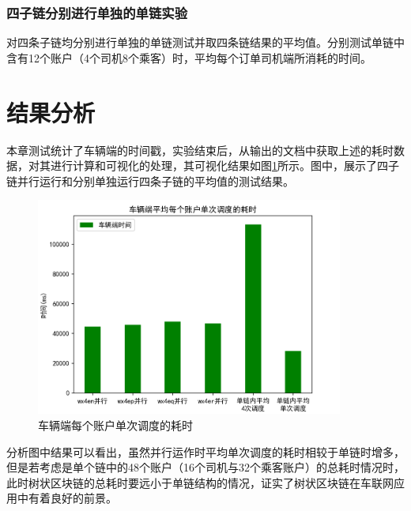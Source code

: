 \subsubsection{四子链分别进行单独的单链实验}

对四条子链均分别进行单独的单链测试并取四条链结果的平均值。分别测试单链中含有12个账户（4个司机8个乘客）时，平均每个订单司机端所消耗的时间。

\section{结果分析}

本章测试统计了车辆端的时间戳，实验结束后，从输出的文档中获取上述的耗时数据，对其进行计算和可视化的处理，其可视化结果如图\ref{fig:车辆端每个账户单次调度的耗时}所示。图中，展示了四子链并行运行和分别单独运行四条子链的平均值的测试结果。


\begin{figure}
	\centering
	\includegraphics[width=0.9\textwidth]{figures/车辆端每个账户单次调度的耗时.png}
	\caption{车辆端每个账户单次调度的耗时}
	\label{fig:车辆端每个账户单次调度的耗时}
\end{figure}

分析图中结果可以看出，虽然并行运作时平均单次调度的耗时相较于单链时增多，但是若考虑是单个链中的48个账户（16个司机与32个乘客账户）的总耗时情况时，此时树状区块链的总耗时要远小于单链结构的情况，证实了树状区块链在车联网应用中有着良好的前景。


